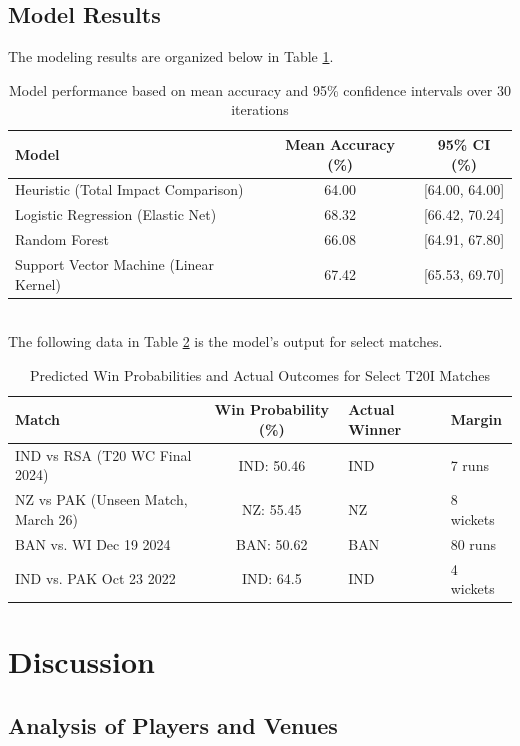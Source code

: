 \documentclass{article}[12pt]
\begin{document}
\subsection{Model Results}
The modeling results are organized below in Table \ref{tab:model-performance}.
\begin{table}[h!]
\centering
\begin{tabular}{|l|c|c|}
\hline
\textbf{Model} & \textbf{Mean Accuracy (\%)} & \textbf{95\% CI (\%)} \\
\hline
Heuristic (Total Impact Comparison) & 64.00 & [64.00, 64.00] \\
Logistic Regression (Elastic Net) & 68.32 & [66.42, 70.24] \\
Random Forest & 66.08 & [64.91, 67.80] \\
Support Vector Machine (Linear Kernel) & 67.42 & [65.53, 69.70] \\
\hline
\end{tabular}
\caption{Model performance based on mean accuracy and 95\% confidence intervals over 30 iterations}
\label{tab:model-performance}
\end{table}
\\
The following data in Table \ref{tab:select} is the model's output for select matches.
\begin{table}[h!]
\centering

\begin{tabular}{|l|c|l|l|}
\hline
\textbf{Match} & \textbf{Win Probability (\%)} & \textbf{Actual Winner} & \textbf{Margin} \\
\hline
IND vs RSA (T20 WC Final 2024) & IND: 50.46 & IND & 7 runs \\
NZ vs PAK (Unseen Match, March 26) & NZ: 55.45 & NZ & 8 wickets \\
BAN vs. WI Dec 19 2024 & BAN: 50.62 & BAN & 80 runs \\
IND vs. PAK Oct 23 2022 & IND: 64.5 & IND & 4 wickets \\
\hline
\end{tabular}
\caption{Predicted Win Probabilities and Actual Outcomes for Select T20I Matches}
\label{tab:select}
\end{table}



\section{Discussion}

\subsection{Analysis of Players and Venues}
\end{document}
